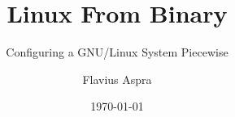 \documentclass[a4paper,11pt,fleqn,twoside,openright,style=afs]{yapbook}
\title{Linux From Binary}
\subtitle{Configuring a GNU/Linux System Piecewise}
\author{Flavius Aspra}
\date{\today}
\begin{document}
\frontmatter

    \maketitle

    \makecopyright

    \tableofcontents

    

\mainmatter

    
    
    
    
    
    

\appendix

    

\backmatter
\end{document}
